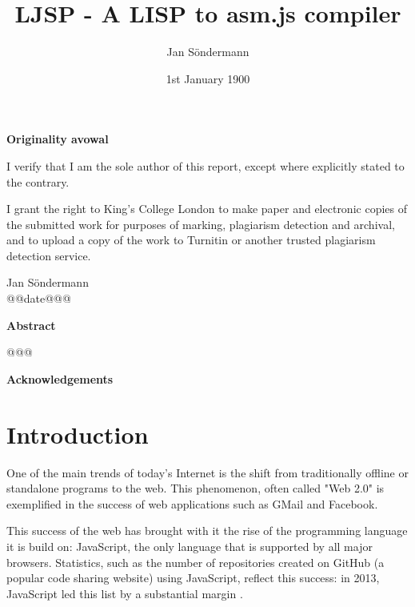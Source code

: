 \documentclass[11pt]{report}
\title{LJSP - A LISP to asm.js compiler}
\author{Jan S\"ondermann}
\date{1st January 1900}
\begin{document}


\maketitle

\onehalfspacing

\begin{center}
\textbf{Originality avowal}
\end{center}

I verify that I am the sole author of this report, except where explicitly stated to the contrary.

I grant the right to King's College London to make paper and electronic copies of the submitted work for purposes of marking, plagiarism detection and archival, and to upload a copy of the work to Turnitin or another trusted plagiarism detection service.

\begin{flushright}
Jan Söndermann \\
@@date@@@
\end{flushright}
\newpage
			
\begin{center}
\textbf{Abstract}
\end{center}

@@@
\newpage

\begin{center}
\textbf{Acknowledgements}
\end{center}
\newpage

\tableofcontents
\newpage

\chapter{Introduction}
One of the main trends of today's Internet is the shift from traditionally offline or standalone programs to the web. This phenomenon, often called "Web 2.0" is exemplified in the success of web applications such as GMail and Facebook.

This success of the web has brought with it the rise of the programming language it is build on: JavaScript, the only language that is supported by all major browsers. Statistics, such as the number of repositories created on GitHub (a popular code sharing website) using JavaScript, reflect this success: in 2013, JavaScript led this list by a substantial margin \cite{githubarchive} \cite{topgithub}.
\end{document}
